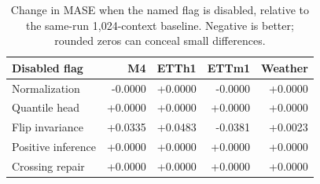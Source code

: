 \begin{table}[!htbp]
\centering
\caption{Change in MASE when the named flag is disabled, relative to the same-run 1,024-context baseline. Negative is better; rounded zeros can conceal small differences.}
\label{tab:flagsmase}
\small
\setlength{\tabcolsep}{3.5pt}
\begin{tabular}{lrrrr}
\hline
Disabled flag & M4 & ETTh1 & ETTm1 & Weather \\
\hline
Normalization & -0.0000 & +0.0000 & -0.0000 & +0.0000 \\
Quantile head & +0.0000 & +0.0000 & +0.0000 & +0.0000 \\
Flip invariance & +0.0335 & +0.0483 & -0.0381 & +0.0023 \\
Positive inference & +0.0000 & +0.0000 & +0.0000 & +0.0000 \\
Crossing repair & +0.0000 & +0.0000 & +0.0000 & +0.0000 \\
\hline
\end{tabular}
\end{table}
